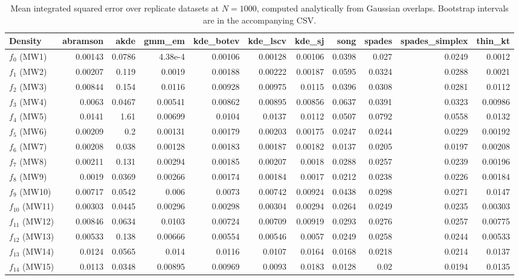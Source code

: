 \begin{table}[htbp]
\centering
\caption{Mean integrated squared error over replicate datasets at $N=1000$, computed analytically from Gaussian overlaps. Bootstrap intervals are in the accompanying CSV.}
\label{tab:ise-N1000}
\begin{tabular}{lrrrrrrrrrr}
\toprule
Density & abramson & akde & gmm\_em & kde\_botev & kde\_lscv & kde\_sj & song & spades & spades\_simplex & thin\_kt \\
\midrule
$f_{0}$ (MW1) & 0.00143 & 0.0786 & 4.38e-4 & 0.00106 & 0.00128 & 0.00106 & 0.0398 & 0.027 & 0.0249 & 0.0012 \\
$f_{1}$ (MW2) & 0.00207 & 0.119 & 0.0019 & 0.00188 & 0.00222 & 0.00187 & 0.0595 & 0.0324 & 0.0288 & 0.0021 \\
$f_{2}$ (MW3) & 0.00844 & 0.154 & 0.0116 & 0.00928 & 0.00975 & 0.0115 & 0.0396 & 0.0308 & 0.0281 & 0.0112 \\
$f_{3}$ (MW4) & 0.0063 & 0.0467 & 0.00541 & 0.00862 & 0.00895 & 0.00856 & 0.0637 & 0.0391 & 0.0323 & 0.00986 \\
$f_{4}$ (MW5) & 0.0141 & 1.61 & 0.00699 & 0.0104 & 0.0137 & 0.0112 & 0.0507 & 0.0792 & 0.0558 & 0.0132 \\
$f_{5}$ (MW6) & 0.00209 & 0.2 & 0.00131 & 0.00179 & 0.00203 & 0.00175 & 0.0247 & 0.0244 & 0.0229 & 0.00192 \\
$f_{6}$ (MW7) & 0.00208 & 0.038 & 0.00128 & 0.00183 & 0.00187 & 0.00182 & 0.0137 & 0.0205 & 0.0197 & 0.00208 \\
$f_{7}$ (MW8) & 0.00211 & 0.131 & 0.00294 & 0.00185 & 0.00207 & 0.0018 & 0.0288 & 0.0257 & 0.0239 & 0.00196 \\
$f_{8}$ (MW9) & 0.0019 & 0.0369 & 0.00266 & 0.00174 & 0.00184 & 0.0017 & 0.0212 & 0.0238 & 0.0226 & 0.00184 \\
$f_{9}$ (MW10) & 0.00717 & 0.0542 & 0.006 & 0.0073 & 0.00742 & 0.00924 & 0.0438 & 0.0298 & 0.0271 & 0.0147 \\
$f_{10}$ (MW11) & 0.00303 & 0.0445 & 0.00296 & 0.00298 & 0.00304 & 0.00294 & 0.0264 & 0.0249 & 0.0235 & 0.00303 \\
$f_{11}$ (MW12) & 0.00846 & 0.0634 & 0.0103 & 0.00724 & 0.00709 & 0.00919 & 0.0293 & 0.0276 & 0.0257 & 0.00775 \\
$f_{12}$ (MW13) & 0.00533 & 0.138 & 0.00666 & 0.00554 & 0.00546 & 0.0057 & 0.0249 & 0.0258 & 0.0244 & 0.00533 \\
$f_{13}$ (MW14) & 0.0124 & 0.0565 & 0.014 & 0.0116 & 0.0107 & 0.0164 & 0.0168 & 0.0218 & 0.0214 & 0.0137 \\
$f_{14}$ (MW15) & 0.0113 & 0.0348 & 0.00895 & 0.00969 & 0.0093 & 0.0183 & 0.0128 & 0.02 & 0.0194 & 0.0135 \\
\bottomrule
\end{tabular}
\end{table}

